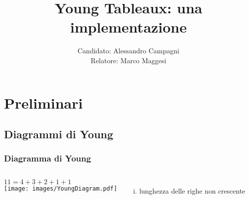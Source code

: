 \documentclass{beamer}
\title{Young Tableaux: una implementazione}
\author[Campagni]{Candidato: Alessandro Campagni \medskip \\Relatore:
  Marco Maggesi}
\date{}
\begin{document}
\begin{frame}
\titlepage
\end{frame}


\section{Preliminari}
\subsection{Diagrammi di Young}

\begin{frame}
\frametitle{Diagramma di Young}
\begin{columns}[T]
\column{5cm}
$11=4+3+2+1+1$\\
\vspace{1cm}
\texttt{[image: images/YoungDiagram.pdf]}
\column{5cm}
\begin{enumerate}[(i)]
\item lunghezza delle righe non crescente
\end{enumerate}
\end{columns}
\end{frame}


\end{document}
